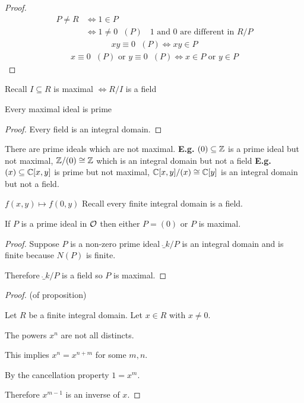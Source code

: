 \documentclass[11pt]{article}
\begin{document}
\begin{proof}
	\begin{align*}
		P \neq R &\iff 1 \in P\\
		& \iff 1 \neq 0 \hspace{7pt} (P) \hspace{7pt} \text{ 1 and 0 are different in }R/P
	\end{align*}
	\begin{align*}
		xy \equiv 0 \hspace{7pt} (P) \iff xy \in P
	\end{align*}
	\begin{align*}
		x \equiv 0 \hspace{7pt} (P) \text{ or } y \equiv 0 \hspace{7pt} (P) \iff x \in P \text{ or }  y \in P
	\end{align*}
\end{proof}


\begin{prop}
Recall $I \subseteq R$ is maximal $\iff R/I$ is a field 
\end{prop}
\begin{cor}
Every maximal ideal is prime
\end{cor}

\begin{proof}
Every field is an integral domain.
\end{proof}
\spa
There are prime ideals which are not maximal.
\spac
\textbf{E.g.} $(0) \subseteq \mathbb{Z}$ is a prime ideal but not maximal, $\mathbb{Z}/(0) \cong \mathbb{Z} $ which is an integral domain but not a field
\spac
\textbf{E.g.} $(x) \subseteq \mathbb{C}[x,y]$ is prime but not maximal, $\mathbb{C}[x,y] /(x) \cong \mathbb{C}[y] $ is an integral domain but not a field.

$f(x,y) \mapsto f(0,y)$
\spac
Recall every finite integral domain is a field.

\begin{cor}
	If $P$ is a prime ideal in $\mathcal{O}$ then either $P=(0)$ or $P$ is maximal.
\end{cor}
\begin{proof}
	Suppose $P$ is a non-zero prime ideal $\ring_k/P$ is an integral domain and is finite because $N(P)$ is finite.

	Therefore $\ring_k/P$ is a field so $P$ is maximal.
\end{proof}

\begin{proof}
	(of proposition)

	Let $R$ be a finite integral domain.
	Let $x \in R$ with $x\neq 0$.

	The powers $x^n$ are not all distincts.
\spa

	This implies $x^n = x^{n+m}$ for some $m, n$.
	\spa

	By the cancellation property $1 = x^m$.
\spa

	Therefore $x^{m-1}$ is an inverse of $x$.
\end{proof}
\end{document}
